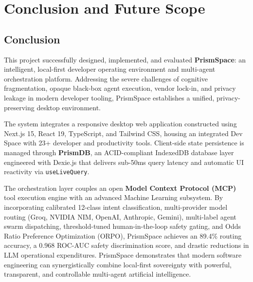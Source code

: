 \documentclass[12pt,a4paper]{report}
\begin{document}
\chapter{Conclusion and Future Scope}

\section{Conclusion}
This project successfully designed, implemented, and evaluated \textbf{PrismSpace}: an intelligent, local-first developer operating environment and multi-agent orchestration platform. Addressing the severe challenges of cognitive fragmentation, opaque black-box agent execution, vendor lock-in, and privacy leakage in modern developer tooling, PrismSpace establishes a unified, privacy-preserving desktop environment.

The system integrates a responsive desktop web application constructed using Next.js 15, React 19, TypeScript, and Tailwind CSS, housing an integrated Dev Space with 23+ developer and productivity tools. Client-side state persistence is managed through \textbf{PrismDB}, an ACID-compliant IndexedDB database layer engineered with Dexie.js that delivers sub-50ms query latency and automatic UI reactivity via \texttt{useLiveQuery}.

The orchestration layer couples an open \textbf{Model Context Protocol (MCP)} tool execution engine with an advanced Machine Learning subsystem. By incorporating calibrated 12-class intent classification, multi-provider model routing (Groq, NVIDIA NIM, OpenAI, Anthropic, Gemini), multi-label agent swarm dispatching, threshold-tuned human-in-the-loop safety gating, and Odds Ratio Preference Optimization (ORPO), PrismSpace achieves an 89.4\% routing accuracy, a 0.968 ROC-AUC safety discrimination score, and drastic reductions in LLM operational expenditures. PrismSpace demonstrates that modern software engineering can synergistically combine local-first sovereignty with powerful, transparent, and controllable multi-agent artificial intelligence.
\end{document}
